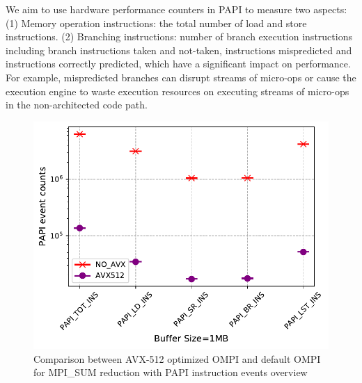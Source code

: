 \documentclass[5p,times,twocolumn]{elsarticle}
\begin{document}
We aim to use hardware performance counters in PAPI to measure two aspects:
(1) Memory operation instructions: the total number of load and store instructions.
(2) Branching instructions: number of branch execution instructions including branch instructions taken and not-taken,
instructions mispredicted and instructions correctly predicted, which have a significant impact on performance.
For example, mispredicted branches can disrupt streams of micro-ops or cause
the execution engine to waste execution resources on executing
streams of micro-ops in the non-architected code path.

\begin{figure}[h]
    \centering
    \includegraphics[width=\linewidth]{papi_ins_review.pdf}
    \caption{Comparison between AVX-512 optimized OMPI and default OMPI for MPI\_SUM reduction with PAPI instruction events overview}
    \label{fig:papiins}%
\end{figure}
\end{document}
